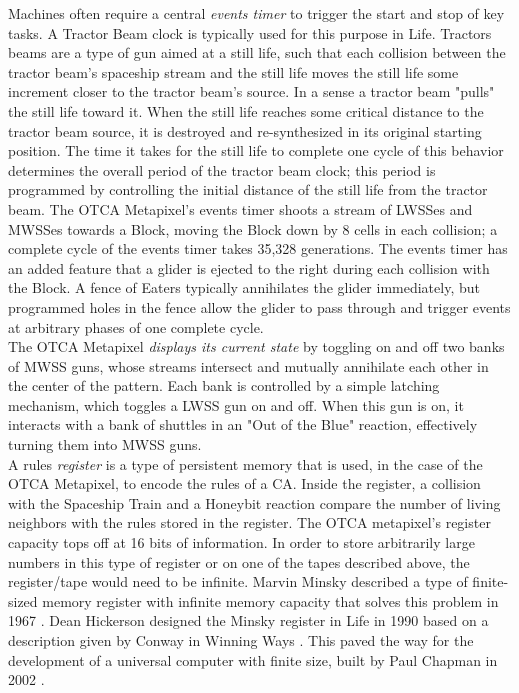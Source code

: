 {Machines often require a central \textit{events timer} to trigger the start and stop of key tasks.  A Tractor Beam clock is typically used for this purpose in Life.  Tractors beams are a type of gun aimed at a still life, such that each collision between the tractor beam's spaceship stream and the still life moves the still life some increment closer to the tractor beam's source.  In a sense a tractor beam "pulls" the still life toward it.  When the still life reaches some critical distance to the tractor beam source, it is destroyed and re-synthesized in its original starting position.  The time it takes for the still life to complete one cycle of this behavior determines the overall period of the tractor beam clock; this period is programmed by controlling the initial distance of the still life from the tractor beam.  The OTCA Metapixel's events timer shoots a stream of LWSSes and MWSSes towards a Block, moving the Block down by 8 cells in each collision; a complete cycle of the events timer takes 35,328 generations.  The events timer has an added feature that a glider is ejected to the right during each collision with the Block.  A fence of Eaters typically annihilates the glider immediately, but programmed holes in the fence allow the glider to pass through and trigger events at arbitrary phases of one complete cycle.\\

The OTCA Metapixel \textit{displays its current state} by toggling on and off two banks of MWSS guns, whose streams intersect and mutually annihilate each other in the center of the pattern.  Each bank is controlled by a simple latching mechanism, which toggles a LWSS gun on and off.  When this gun is on, it interacts with a bank of shuttles in an "Out of the Blue" reaction, effectively turning them into MWSS guns.\\

A rules \textit{register} is a type of persistent memory that is used, in the case of the OTCA Metapixel, to encode the rules of a CA.  Inside the register, a collision with the Spaceship Train and a Honeybit reaction compare the number of living neighbors with the rules stored in the register.  The OTCA metapixel's register capacity tops off at 16 bits of information.  In order to store arbitrarily large numbers in this type of register or on one of the tapes described above, the register/tape would need to be infinite.  Marvin Minsky described a type of finite-sized memory register with infinite memory capacity that solves this problem in 1967 \cite{Minsky1967}.  Dean Hickerson designed the Minsky register in Life \cite{Hickerson1900} in 1990 based on a description given by Conway in Winning Ways \cite{Berekamp1982}.  This paved the way for the development of a universal computer with finite size, built by Paul Chapman in 2002 \cite{Chapman2002}.\\

}
